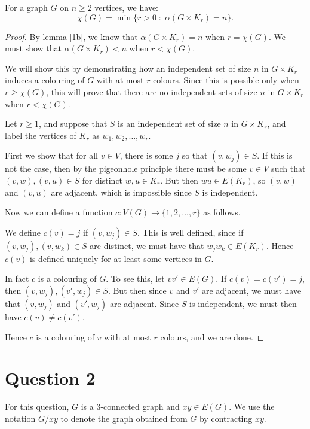 \documentclass{unswmaths}
\begin{document}
\begin{corollary}[Part (c)]
    For a graph $G$ on $n\geq 2$ vertices, we have:
    \begin{equation*}
        \chi(G) = \min\{r > 0\;:\;\alpha(G\times K_r) = n\}.
    \end{equation*}
\end{corollary}
\begin{proof}
    By lemma \ref{1b}, we know that $\alpha(G\times K_r) = n$
    when $r = \chi(G)$. We must show that $\alpha(G \times K_r) < n$
    when $r < \chi(G)$. 
    
    We will show this by demonstrating how an independent
    set of size $n$ in $G \times K_r$ induces a colouring
    of $G$ with at most $r$ colours. Since this is possible only when $r \geq \chi(G)$,
    this will prove that there are no independent sets
    of size $n$ in $G\times K_r$ when $r < \chi(G)$.
    
    Let $r \geq 1$, and suppose that $S$ is an independent
    set of size $n$ in $G\times K_r$, and label
    the vertices of $K_r$ as $w_1,w_2,\ldots,w_r$.
    
    First we show that for all $v \in V$, there
    is some $j$ so that $(v,w_j) \in S$. 
    If this is not the case, then by the pigeonhole principle
    there must be some $v \in V$ such that $(v,w),(v,u) \in S$
    for distinct $w,u \in K_r$. But then $wu \in E(K_r)$, so $(v,w)$
    and $(v,u)$ are adjacent, which is impossible
    since $S$ is independent.
    
    Now we can define a function $c:V(G)\to \{1,2,\ldots,r\}$
    as follows. 
    
    We define $c(v) = j$ if $(v,w_j) \in S$. 
    This is well defined, since if $(v,w_j),(v,w_k) \in S$
    are distinct, we must have that $w_j w_k \in E(K_r)$.
    Hence $c(v)$ is defined uniquely for at least some vertices
    in $G$.
    
    In fact $c$ is a colouring of $G$. To see this, let $vv' \in E(G)$. 
    If $c(v) = c(v') = j$, then $(v,w_j),(v',w_j) \in S$.
    But then since $v$ and $v'$ are adjacent, we must have that $(v,w_j)$
    and $(v',w_j)$ are adjacent. Since $S$ is independent, we must then
    have $c(v) \neq c(v')$. 
    
    Hence $c$ is a colouring of $v$ with at most $r$ colours,
    and we are done.    
\end{proof} 

\section*{Question 2}
For this question, $G$ is a $3$-connected graph and $xy \in E(G)$. 
We use the notation $G/xy$ to denote the graph obtained from $G$
by contracting $xy$.
\end{document}
